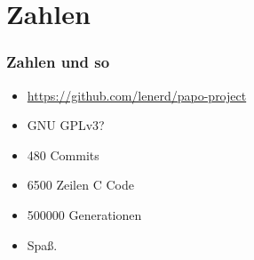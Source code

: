 \section*{Zahlen}

\begin{frame}
    \frametitle{Zahlen und so}

    \begin{itemize}
        \item \url{https://github.com/lenerd/papo-project}
        \item GNU GPLv3?
        \item 480 Commits
        \item \num{6500} Zeilen C Code
        \item \num{500000} Generationen
        \item Spaß.
    \end{itemize}
\end{frame}
